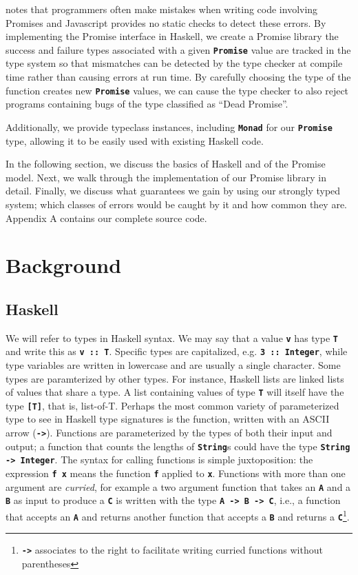 \documentclass[12pt, english, letterpaper]{kuthesis}
\newcommand{\lit}[1]{\textbf{\texttt{#1}}}
\begin{document}
\cite{madsen} notes that programmers often make mistakes when writing code involving \textsf{Promises} and Javascript provides no static checks to detect these errors.  By implementing the \textsf{Promise} interface in Haskell, we create a \textsf{Promise} library the success and failure types associated with a given \lit{Promise} value are tracked in the type system so that mismatches can be detected by the type checker at compile time rather than causing errors at run time.  By carefully choosing the type of the function creates new \lit{Promise} values, we can cause the type checker to also reject programs containing bugs of the type \cite{madsen} classified as ``Dead Promise''.

Additionally, we provide typeclass instances, including \lit{Monad} for our \lit{Promise} type, allowing it to be easily used with existing Haskell code.

In the following section, we discuss the basics of Haskell and of the \textsf{Promise} model.  Next, we walk through the implementation of our \textsf{Promise} library in detail.  Finally, we discuss what guarantees we gain by using our strongly typed system; which classes of errors would be caught by it and how common they are.  Appendix A contains our complete source code.
\chapter*{Background}
\section*{Haskell}
We will refer to types in Haskell syntax.  We may say that a value \lit v has type \lit T and write this as \lit{v ::\ T}.  Specific types are capitalized, e.g. \lit{3 ::\ Integer}, while type variables are written in lowercase and are usually a single character.  Some types are paramterized by other types.  For instance, Haskell lists are linked lists of values that share a type.  A list containing values of type \lit T will itself have the type \lit{[T]}, that is, list-of-T.  Perhaps the most common variety of parameterized type to see in Haskell type signatures is the function, written with an ASCII arrow (\lit{->}).  Functions are parameterized by the types of both their input and output; a function that counts the lengths of \lit{String}s could have the type \lit{String -> Integer}.  The syntax for calling functions is simple juxtoposition: the expression \lit{f x} means the function \lit f applied to \lit x.  Functions with more than one argument are \emph{curried}, for example a two argument function that takes an \lit A and a \lit B as input to produce a \lit C is written with the type \lit{A -> B -> C}, i.e.,  a function that accepts an \lit A and returns another function that accepts a \lit B and returns a \lit C\footnote{\lit{->} associates to the right to facilitate writing curried functions without parentheses}.
\end{document}
